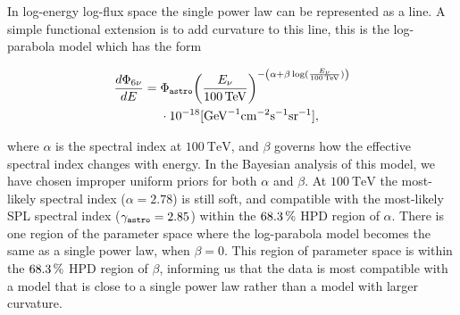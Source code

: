 In log-energy log-flux space the single power law can be represented as a line.
A simple functional extension is to add curvature to this line, this is the log-parabola model which has the form

\begin{linenomath*}
	\begin{equation}
	\begin{split}
	\frac{d\Phi_{6\nu}}{dE}={}&\Phi_\texttt{astro}{\left(\frac{E_\nu}{\SI{100}\TeV}\right)}^{-\left(\alpha+\beta \log(\frac{E_\nu}{\SI{100}\TeV})\right)} \\ & \cdot 10^{-18}[\textmd{GeV}^{-1}\textmd{cm}^{-2}\textmd{s}^{-1}\textmd{sr}^{-1}],
	\end{split}\label{eq:logparabola_flux}
	\end{equation}
\end{linenomath*}
where $\alpha$ is the spectral index at $\SI{100}\TeV$, and $\beta$ governs how the effective spectral index changes with energy.
In the Bayesian analysis of this model, we have chosen improper uniform priors for both $\alpha$ and $\beta$.
At $\SI{100}\TeV$ the most-likely spectral index ($\alpha=2.78$) is still soft, and compatible with the most-likely SPL spectral index ($\gamma_\texttt{astro}=2.85$) within the $\SI{68.3}\percent$ HPD region of $\alpha$.
There is one region of the parameter space where the log-parabola model becomes the same as a single power law, when $\beta=0$.
This region of parameter space is within the $\SI{68.3}\percent$ HPD region of $\beta$, informing us that the data is most compatible with a model that is close to a single power law rather than a model with larger curvature.

